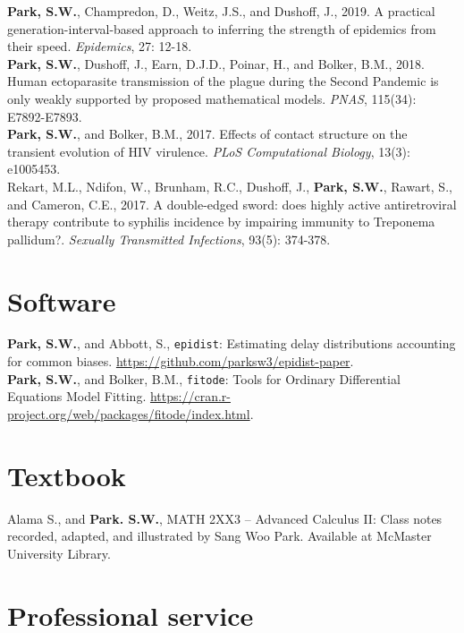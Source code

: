 \documentclass[11pt]{article} %
\begin{document}
 \textbf{Park, S.W.}, Champredon, D., Weitz, J.S., and Dushoff, J., 2019. A practical generation-interval-based approach to inferring the strength of epidemics from their speed. \textit{Epidemics}, 27: 12-18.\\

 \textbf{Park, S.W.}, Dushoff, J., Earn, D.J.D., Poinar, H., and Bolker, B.M., 2018. Human
ectoparasite transmission of the plague during the Second Pandemic is only weakly
supported by proposed mathematical models. \textit{PNAS}, 115(34): E7892-E7893.\\

 \textbf{Park, S.W.}, and Bolker, B.M., 2017. Effects of contact structure on the transient
evolution of HIV virulence. \textit{PLoS Computational Biology}, 13(3): e1005453.\\

 Rekart, M.L., Ndifon, W., Brunham, R.C., Dushoff, J., \textbf{Park, S.W.}, Rawart, S., and
Cameron, C.E., 2017. A double-edged sword: does highly active antiretroviral therapy contribute to syphilis incidence by impairing immunity to Treponema pallidum?.
\textit{Sexually Transmitted Infections}, 93(5): 374-378.\\

\section*{Software}

 \textbf{Park, S.W.}, and Abbott, S., \texttt{epidist}: Estimating delay distributions accounting for common biases. \url{https://github.com/parksw3/epidist-paper}.\\

 \textbf{Park, S.W.}, and Bolker, B.M., \texttt{fitode}: Tools for Ordinary Differential Equations Model Fitting. \url{https://cran.r-project.org/web/packages/fitode/index.html}.

\section*{Textbook}

 Alama S., and \textbf{Park. S.W.}, MATH 2XX3 -- Advanced Calculus II: Class notes recorded, adapted, and illustrated by Sang Woo Park. Available at McMaster University Library.

\section*{Professional service}
\end{document}
